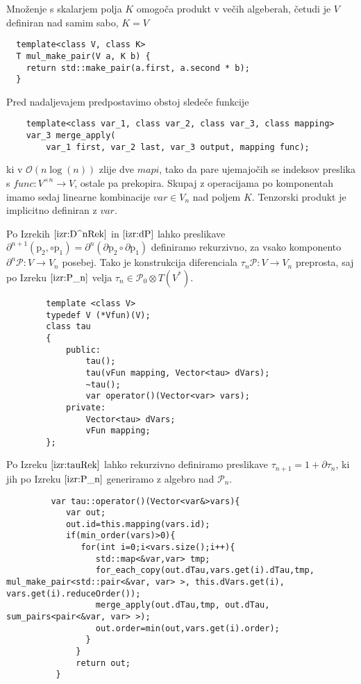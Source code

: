 \documentclass{article}
\newcommand{\dP}{\mathcal{P}}
\newcommand{\D}{\partial}
\newcommand{\sumd}{\tau}
\begin{document}
Množenje s skalarjem polja $K$ omogoča produkt v večih algeberah, četudi je $V$ definiran nad samim sabo, $K=V$

\begin{lstlisting}
  template<class V, class K>
  T mul_make_pair(V a, K b) {
    return std::make_pair(a.first, a.second * b);
  }
  \end{lstlisting}      
  
   Pred nadaljevajem predpostavimo obstoj sledeče funkcije
    \begin{lstlisting}
    template<class var_1, class var_2, class var_3, class mapping>
    var_3 merge_apply(
        var_1 first, var_2 last, var_3 output, mapping func);
    \end{lstlisting}
    
    ki v $\mathcal{O}(n\log(n))$ zlije dve $\textit{mapi}$, tako da pare ujemajočih se indeksov preslika s $func: V^{\times n}\to V$, ostale pa prekopira. Skupaj z operacijama po komponentah imamo sedaj linearne kombinacije $var\in V_n$ nad poljem $K$. Tenzorski produkt je implicitno definiran z $var$.
    
     
      Po Izrekih $\ref{izr:D^nRek}$ in $\ref{izr:dP}$ lahko preslikave $\D^{n+1}(\mathrm{p}_2,\circ\mathrm{p}_1)=\D^n(\D\mathrm{p}_2\circ\D\mathrm{p}_1)$ definiramo rekurzivno, za vsako komponento $\D^n\dP:V\to V_n$ posebej. Tako je konstrukcija diferenciala $\sumd_n\dP:V\to V_n$ preprosta, saj po Izreku $\ref{izr:P_n}$ velja $\sumd_n\in\dP_0\otimes T(V^*)$.
        
        \begin{lstlisting}
        template <class V>
        typedef V (*Vfun)(V);
        class tau
        {
            public:
                tau();
                tau(vFun mapping, Vector<tau> dVars);
                ~tau();
                var operator()(Vector<var> vars);
            private:
                Vector<tau> dVars;
                vFun mapping;
        }; 
        \end{lstlisting}

      Po Izreku $\ref{izr:tauRek}$ lahko rekurzivno definiramo preslikave $\sumd_{n+1}=1+\D\sumd_n$, ki jih po Izreku $\ref{izr:P_n}$ generiramo z algebro nad $\dP_n$.
      
      \begin{lstlisting}
         var tau::operator()(Vector<var&>vars){    
            var out;
            out.id=this.mapping(vars.id);
            if(min_order(vars)>0){
               for(int i=0;i<vars.size();i++){
                  std::map<&var,var> tmp;
            	  for_each_copy(out.dTau,vars.get(i).dTau,tmp, mul_make_pair<std::pair<&var, var> >, this.dVars.get(i), vars.get(i).reduceOrder());
            	  merge_apply(out.dTau,tmp, out.dTau, sum_pairs<pair<&var, var> >);
              	  out.order=min(out,vars.get(i).order);
              	}
              }
              return out;
          }
        \end{lstlisting}
      
\end{document}
